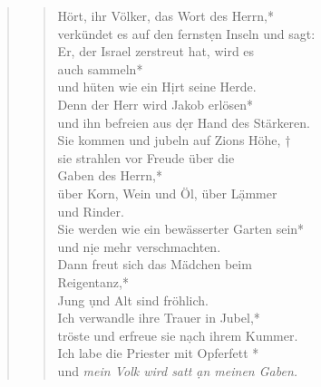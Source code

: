 \begin{quote}
 
\begin{verse}
Hört, ihr Völker, das Wort des Herrn,*\\
verkündet es auf den fernst\d en Inseln und sagt:\\ 
\vin Er, der Israel zerstreut hat, wird es \\ \vin auch sammeln*\\
\vin und hüten wie ein H\d irt seine Herde.\\
Denn der Herr wird Jakob erlösen*\\
und ihn befreien aus d\d er Hand des Stärkeren.\\
\vin Sie kommen und jubeln auf Zions Höhe, †\\
\vin sie strahlen vor Freude über die \\ \vin Gaben des Herrn,*\\ 
\vin über Korn, Wein und Öl, über L\d ämmer\\ \vin und Rinder.\\ 
Sie werden wie ein bewässerter Garten sein*\\ 
und n\d ie mehr verschmachten.\\
\vin Dann freut sich das Mädchen beim\\ \vin  Reigentanz,*\\
\vin Jung \d und Alt sind fröhlich.\\ 
Ich verwandle ihre Trauer in Jubel,*\\
tröste und erfreue sie n\d ach ihrem Kummer.\\
\vin Ich labe die Priester mit Opferfett *\\
\vin und \textit{mein Volk wird satt \d an meinen Gaben.}\\

\end{verse}

\end{quote}


\def\greinitialformat#1{{\fontsize{40}{40}\selectfont #1}}
\gresetfirstlineaboveinitial{\small \textcolor{red}{Is 12}}{}
\setaboveinitialseparation{0.72mm}


